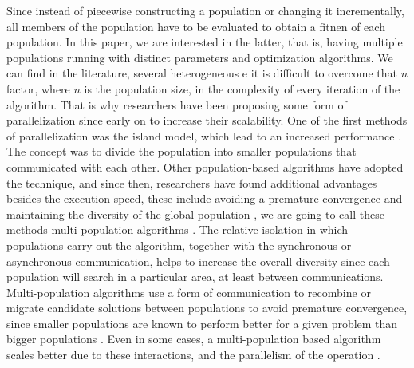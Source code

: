 Since instead of piecewise constructing a population or changing it
incrementally, all members of the population have to be evaluated to
obtain a fitnen of each population.  In this paper, we are interested in the
latter, that is, having multiple populations running with distinct parameters
and optimization algorithms. We can find in the literature, several
heterogeneous e it is difficult to overcome that $n$ factor, where $n$
is the population size, in the complexity of every iteration of the
algorithm. That is why researchers have been proposing some form of
parallelization since early on \cite{muhlenbein1988evolution} to
increase their scalability. %
One of the first methods of parallelization was the island
model, which lead to an increased performance
\cite{gorges1990explicit,grosso1985computer}. The concept was to divide the
population into smaller populations that communicated with each other. Other
population-based algorithms have adopted the technique, and since then,
researchers have found additional advantages besides the execution speed, 
these include avoiding a premature convergence and maintaining the diversity of the
global population \cite{li2015multi}, we are going to call these methods 
multi-population algorithms \cite{Ma2019}. The relative 
isolation in which populations carry out the algorithm, together with the
synchronous or asynchronous communication, helps to increase the overall
diversity since each population will search in a particular area, at least
between communications. Multi-population algorithms use a form of
communication to recombine or migrate candidate solutions between populations
to avoid premature convergence, since smaller populations are known to perform
better for a given problem than bigger populations
\cite{li2016multi,wu2016differential}.  Even in some cases, a multi-population based
algorithm scales better due to these interactions, and the parallelism of the
operation \cite{ALBA20027}. 

